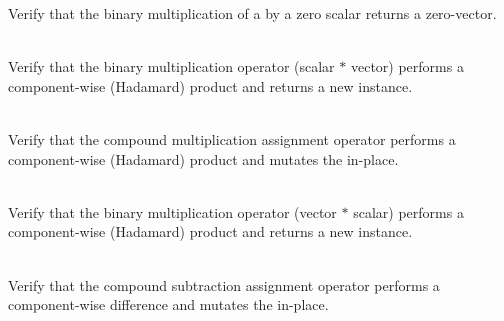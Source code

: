 \begin{DoxyRefList}
\label{test__test000025}%
%
Verify that the binary multiplication of a  by a zero scalar returns a zero-\/vector.  
\item[{\parbox[t]{\linewidth}{Member \doxylink{group___f_g_m___vec4___multiplication_ga146296fc0db3b7a86835ae601ff1f0c7}{Vector4\+DScalar\+Multiplication\+\_\+\+Scalar\+Times\+AVector\+Returns\+Scaled\+Vector} ()}}]\hfill \\
\label{test__test000028}%
%
Verify that the binary multiplication operator (scalar \texorpdfstring{$\ast$}{*} vector) performs a component-\/wise (Hadamard) product and returns a new  instance.  
\item[{\parbox[t]{\linewidth}{Member \doxylink{group___f_g_m___vec4___multiplication_gaf8799c2258568f54625530e29a55aef5}{Vector4\+DScalar\+Multiplication\+\_\+\+Vector\+Times\+Equal\+Scalar\+Is\+The\+Same\+Vector\+Scaled} ()}}]\hfill \\
\label{test__test000029}%
%
Verify that the compound multiplication assignment operator performs a component-\/wise (Hadamard) product and mutates the  in-\/place.  
\item[{\parbox[t]{\linewidth}{Member \doxylink{group___f_g_m___vec4___multiplication_ga939ff05d1b334caedd7c72a9874e76e9}{Vector4\+DScalar\+Multiplication\+\_\+\+Vector\+Times\+Scalar\+Returns\+Scaled\+Vector} ()}}]\hfill \\
\label{test__test000027}%
%
Verify that the binary multiplication operator (vector \texorpdfstring{$\ast$}{*} scalar) performs a component-\/wise (Hadamard) product and returns a new  instance.  
\item[{\parbox[t]{\linewidth}{Member \doxylink{group___f_g_m___vec4___subtraction_ga7f719a61564eef711249f2d8aa8b55c9}{Vector4\+DSubtraction\+\_\+\+Minus\+Equals\+Operator\+\_\+\+Returns\+Same\+Vector\+With\+Difference} ()}}]\hfill \\
\label{test__test000022}%
%
Verify that the compound subtraction assignment operator performs a component-\/wise difference and mutates the  in-\/place.  
\item[{\parbox[t]{\linewidth}{Member \doxylink{group___f_g_m___vec4___subtraction_ga36d6f36a32ff65c288a299cd3c682278}{Vector4\+DSubtraction\+\_\+\+Minus\+Operator\+\_\+\+Returns\+Difference} ()}}]\hfill \\

\end{DoxyRefList}
